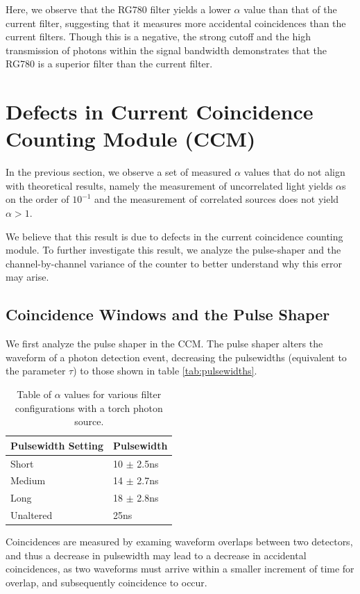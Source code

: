 \documentclass[letterpaper, 11 pt]{article}
\begin{document}
Here, we observe that the RG780 filter yields a lower $\alpha$ value than that of the 
current filter, suggesting that it measures more accidental coincidences than the
current filters. Though this is a negative, the strong cutoff and the high transmission of
photons within the signal bandwidth demonstrates that the RG780 is a superior filter than the current filter.

\section{Defects in Current Coincidence Counting Module (CCM)} \label{sec:ccm_broke}

In the previous section, we observe a set of measured $\alpha$ values that do not align with
theoretical results, namely the measurement of uncorrelated light yields $\alpha$s on the order of $10^{-1}$
and the measurement of correlated sources does not yield $\alpha > 1$.

We believe that this result is due to defects in the current coincidence counting module. To further
investigate this result, we analyze the pulse-shaper and the channel-by-channel variance of the counter
to better understand why this error may arise.

\subsection{Coincidence Windows and the Pulse Shaper}

We first analyze the pulse shaper in the CCM. The pulse shaper alters the waveform of a
photon detection event, decreasing the pulsewidths (equivalent to the parameter $\tau$) to those shown in table \ref{tab:pulsewidths}.
\begin{table}[H]
    \centering
    \begin{tabular}{|l|l|}
    \hline
    \textbf{Pulsewidth Setting} & \textbf{Pulsewidth} \\ \hline
    Short        & 10 $\pm$ 2.5ns                   \\ \hline
    Medium        & 14 $\pm$ 2.7ns                   \\ \hline
    Long        & 18 $\pm$ 2.8ns                   \\ \hline
    Unaltered                  & 25ns                   \\ \hline
    \end{tabular}
    \caption{Table of $\alpha$ values for various filter configurations with a torch photon source.}
\end{table}\label{tab:pulsewidths}
Coincidences are measured by examing waveform overlaps between two
detectors, and thus a decrease in pulsewidth may lead to a decrease in accidental coincidences,
as two waveforms must arrive within a smaller increment of time for overlap,
and subsequently coincidence to occur.
\end{document}
